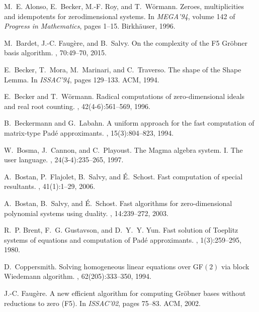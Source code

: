 \documentclass[12pt]{article}
\begin{document}

\begin{thebibliography}{10}

M.~E. Alonso, E.~Becker, M.-F. Roy, and T.~W{\"o}rmann.
\newblock Zeroes, multiplicities and idempotents for zerodimensional systems.
\newblock In {\em MEGA'94}, volume 142 of {\em Progress in Mathematics}, pages
  1--15. Birkh{\"a}user, 1996.

M.~Bardet, J.-C. Faug{\`e}re, and B.~Salvy.
\newblock On the complexity of the {F}5 {G}r{\"o}bner basis algorithm.
, 70:49--70, 2015.

E.~Becker, T.~Mora, M.~Marinari, and C.~Traverso.
\newblock The shape of the {S}hape {L}emma.
\newblock In {\em ISSAC'94}, pages 129--133. ACM, 1994.

E.~Becker and T.~W{\"o}rmann.
\newblock Radical computations of zero-dimensional ideals and real root
  counting.
, 42(4-6):561--569,
  1996.

B.~Beckermann and G.~Labahn.
\newblock A uniform approach for the fast computation of matrix-type {P}ad\'e
  approximants.
, 15(3):804--823, 1994.

W.~Bosma, J.~Cannon, and C.~Playoust.
\newblock The {M}agma algebra system. {I}. {T}he user language.
, 24(3-4):235--265, 1997.

A.~Bostan, P.~Flajolet, B.~Salvy, and {\'E}.~Schost.
\newblock Fast computation of special resultants.
, 41(1):1--29, 2006.

A.~Bostan, B.~Salvy, and {\'E}.~Schost.
\newblock Fast algorithms for zero-dimensional polynomial systems using
  duality.
, 14:239--272, 2003.

R.~P. Brent, F.~G. Gustavson, and D.~Y.~Y. Yun.
\newblock Fast solution of {Toeplitz} systems of equations and computation of
  {Pad\'e} approximants.
, 1(3):259--295, 1980.

D.~Coppersmith.
\newblock Solving homogeneous linear equations over {GF}$(2)$ via block
  {W}iedemann algorithm.
, 62(205):333--350, 1994.

J.-C. Faug\`ere.
\newblock A new efficient algorithm for computing {G}r\"obner bases without
  reductions to zero ({F}5).
\newblock In {\em ISSAC'02}, pages 75--83. ACM, 2002.


\end{thebibliography}
\end{document}
